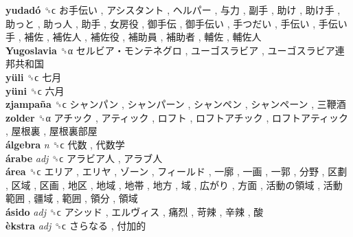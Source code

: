 \textbf{yudadó} ␝ϲ   お手伝い ,  アシスタント ,  ヘルパー ,  与力 ,  副手 ,  助け ,  助け手 ,  助っと ,  助っ人 ,  助手 ,  女房役 ,  御手伝 ,  御手伝い ,  手つだい ,  手伝い ,  手伝い手 ,  補佐 ,  補佐人 ,  補佐役 ,  補助員 ,  補助者 ,  輔佐 ,  輔佐人   \\
\textbf{Yugoslavia} ␝α   セルビア・モンテネグロ ,  ユーゴスラビア ,  ユーゴスラビア連邦共和国   \\
\textbf{yüli} ␝ϲ   七月   \\
\textbf{yüni} ␝ϲ   六月   \\
\textbf{zjampaña} ␝ϲ   シャンパン ,  シャンパーン ,  シャンペン ,  シャンペーン ,  三鞭酒   \\
\textbf{zolder} ␝α   アチック ,  アティック ,  ロフト ,  ロフトアチック ,  ロフトアティック ,  屋根裏 ,  屋根裏部屋   \\
\textbf{álgebra} \emph{n}  ␝ϲ   代数 ,  代数学   \\
\textbf{árabe} \emph{adj}  ␝ϲ   アラビア人 ,  アラブ人   \\
\textbf{área} ␝ϲ   エリア ,  エリヤ ,  ゾーン ,  フィールド ,  一廓 ,  一画 ,  一郭 ,  分野 ,  区劃 ,  区域 ,  区画 ,  地区 ,  地域 ,  地帯 ,  地方 ,  域 ,  広がり ,  方面 ,  活動の領域 ,  活動範囲 ,  疆域 ,  範囲 ,  領分 ,  領域   \\
\textbf{ásido} \emph{adj}  ␝ϲ   アシッド ,  エルヴィス ,  痛烈 ,  苛辣 ,  辛辣 ,  酸   \\
\textbf{èkstra} \emph{adj}  ␝ϲ   さらなる ,  付加的   \\
